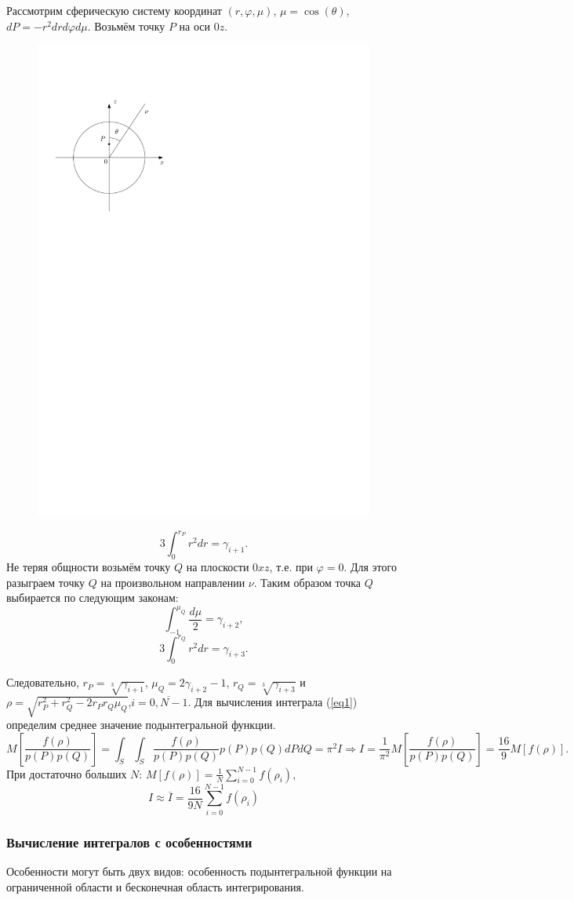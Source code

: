 \documentclass[
11pt,
master, %
subf, %
href, %
colorlinks=true, %
times, %
]{disser}
\begin{document}
Рассмотрим сферическую систему координат $(r, \varphi, \mu)$, $\mu = \cos(\theta)$, $dP = -r^2 drd\varphi d\mu$. Возьмём точку $P$ на оси $0z$.
\begin{figure}[h]
  \centering
  \includegraphics[width=0.4\linewidth]{ris1}
  \caption{}\label{ris:1}
\end{figure}

$$3\int_{0}^{r_P} r^2 dr = \gamma_{i+1}.$$
Не теряя общности возьмём точку $Q$ на плоскости $0xz$, т.е. при $\varphi = 0$. Для этого разыграем точку $Q$ на произвольном направлении $\nu$. Таким образом точка $Q$ выбирается по следующим законам:
$$\int_{-1}^{\mu_Q} \frac{d\mu}{2} = \gamma_{i+2},$$
$$3\int_{0}^{r_Q} r^2 dr = \gamma_{i+3}.$$

Следовательно, $r_P = \sqrt[3]{\gamma_{i+1}}$, $\mu_Q = 2\gamma_{i+2} - 1$, $r_Q = \sqrt[3]{\gamma_{i+3}}$ и $\rho = \sqrt{r_P^2 + r_Q^2 - 2r_P r_Q \mu_Q}$,\;$i = \overline{0,N-1}$.
Для вычисления интеграла (\ref{eq1}) определим среднее значение подынтегральной функции.
$$M\left[\frac{f(\rho)}{p(P)p(Q)}\right] = \int_{S}\int_{S}\frac{f(\rho)}{p(P)p(Q)} p(P)p(Q)dPdQ = \pi^2 I \Rightarrow I = \frac{1}{\pi^2} M\left[\frac{f(\rho)}{p(P)p(Q)}\right] = \frac{16}{9}M[f(\rho)].$$
При достаточно больших $N$: $M[f(\rho)] = \frac{1}{N}\sum_{i=0}^{N-1} f(\rho_i)$,
\begin{equation}\label{eq2}
  I \approx \overline{I} = \frac{16}{9N}\sum_{i=0}^{N-1} f(\rho_i)
\end{equation}

\subsubsection{Вычисление интегралов с особенностями}
Особенности могут быть двух видов: особенность подынтегральной функции на ограниченной области и бесконечная область интегрирования.
\end{document}
